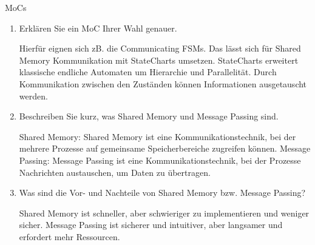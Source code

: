 \documentclass{article}
\begin{document}
\begin{exercise}{MoCs}
  \begin{enumerate}
    \item Erklären Sie ein MoC Ihrer Wahl genauer.

          \begin{solution}
            Hierfür eignen sich zB. die Communicating FSMs. Das lässt sich für Shared Memory Kommunikation mit StateCharts umsetzen. StateCharts erweitert klassische endliche Automaten um Hierarchie und Parallelität. Durch Kommunikation zwischen den Zuständen können Informationen ausgetauscht werden.
          \end{solution}

    \item Beschreiben Sie kurz, was Shared Memory und Message Passing sind.

          \begin{solution}
            Shared Memory: Shared Memory ist eine Kommunikationstechnik, bei der mehrere Prozesse auf gemeinsame Speicherbereiche zugreifen können.
            Message Passing: Message Passing ist eine Kommunikationstechnik, bei der Prozesse Nachrichten austauschen, um Daten zu übertragen.
          \end{solution}

    \item Was sind die Vor- und Nachteile von Shared Memory bzw. Message Passing?

          \begin{solution}
            Shared Memory ist schneller, aber schwieriger zu implementieren und weniger sicher.
            Message Passing ist sicherer und intuitiver, aber langsamer und erfordert mehr Ressourcen.
          \end{solution}
  \end{enumerate}
\end{exercise}
\end{document}
